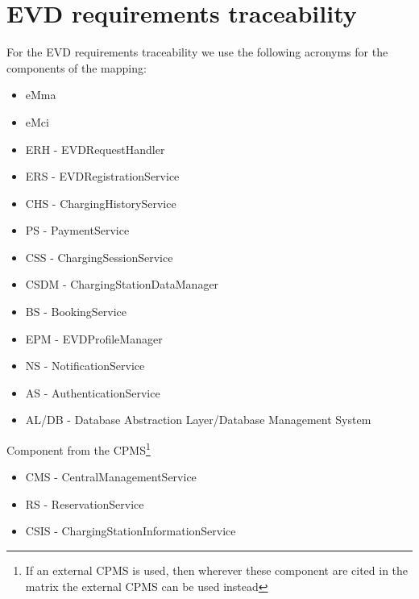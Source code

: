 
\clearpage
\section{EVD requirements traceability}
For the EVD requirements traceability we use the following acronyms for the components of the mapping:
\begin{itemize}
    \item eMma
    \item eMci
    \item ERH - EVDRequestHandler
    \item ERS - EVDRegistrationService
    \item CHS - ChargingHistoryService
    \item PS - PaymentService
    \item CSS - ChargingSessionService
    \item CSDM - ChargingStationDataManager
    \item BS - BookingService
    \item EPM - EVDProfileManager
    \item NS - NotificationService
    \item AS - AuthenticationService
    \item AL/DB - Database Abstraction Layer/Database Management System
\end{itemize}
Component from the CPMS\footnote{If an external CPMS is used, then wherever these component are cited in the matrix the external CPMS can be used instead}
\begin{itemize}
    \item CMS - CentralManagementService
    \item RS - ReservationService
    \item CSIS - ChargingStationInformationService
\end{itemize}
